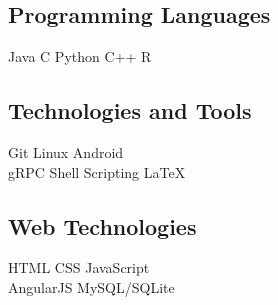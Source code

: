 \documentclass[]{chowes-resume}
\begin{document}
\begin{minipage}[t]{0.33\textwidth}
\subsection{Programming Languages}
Java \textbullet{} C \textbullet{} Python \textbullet{} C++ \textbullet{} R
\sectionsep

\subsection{Technologies and Tools}
Git \textbullet{} Linux \textbullet{} Android \\
gRPC \textbullet{} Shell Scripting \textbullet{} \LaTeX
\sectionsep

\subsection{Web Technologies}
HTML \textbullet{} CSS \textbullet{} JavaScript \\ 
AngularJS \textbullet{} MySQL/SQLite
\sectionsep


%
%

\end{minipage} 
\hfill
\end{document}
